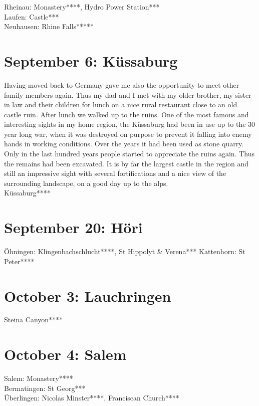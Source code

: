 Rheinau: Monastery****, Hydro Power Station***\\
Laufen: Castle***\\
Neuhausen: Rhine Falls*****

\section{September 6: K\"ussaburg}
\label{2020:Kuessaburg}

Having moved back to Germany gave me also the opportunity to meet other family members again. Thus my dad and I met with my older brother, my sister in law and their children for lunch on a nice rural restaurant close to an old castle ruin. After lunch we walked up to the ruins. One of the most famous and interesting sights in my home region, the K\"ussaburg had been in use up to the 30 year long war, when it was destroyed on purpose to prevent it falling into enemy hands in working conditions. Over the years it had been used as stone quarry. Only in the last hundred years people started to appreciate the ruins again. Thus the remains had been excavated. It is by far the largest castle in the region and still an impressive sight with several fortifications and a nice view of the surrounding landscape, on a good day up to the alps.\\

K\"ussaburg****

\section{September 20: H\"ori}
\label{2020:Hoeri}

\"Ohningen: Klingenbachschlucht****, St Hippolyt \& Verena***
Kattenhorn: St Peter****

\section{October 3: Lauchringen}
\label{2020:Lauchringen}

Steina Canyon****

\section{October 4: Salem}
\label{2020:Salem}

Salem: Monastery****\\
Bermatingen: St Georg***\\
\"Uberlingen: Nicolas Minster****, Franciscan Church****

